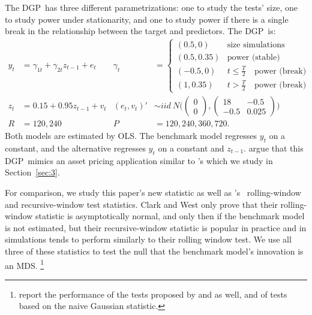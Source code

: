 \documentclass[12pt,fleqn]{article}
\newcommand\citepos[2][]{\citeauthor{#2}'s \citeyearpar[#1]{#2}}
\newcommand\poscw{\citeauthor{ClW:06}'s \citeyearpar{ClW:06,ClW:07}}
\providecommand\testsize{[missing]}
\providecommand\totalsims{[missing]}
\theoremstyle{definition}
\newcommand{\dgp}{DGP}
\newcommand{\mds}{MDS}
\newcommand{\ols}{OLS}
\newcommand{\oos}{OOS}
\begin{document}
The \dgp\ has three different parametrizations: one to study the
tests' size, one to study power under stationarity, and one to study
power if there is a single break in the relationship between the
target and predictors.  The \dgp\ is:
\begin{align*}
  y_t &= \gamma_{1t} + \gamma_{2t} z_{t-1} + e_t &
  \gamma_t &=
  \begin{cases}
    (0.5, 0)    & \text{size simulations} \\
    (0.5, 0.35) & \text{power (stable)} \\
    (-0.5, 0)    & t \leq \tfrac{T}{2} \quad \text{power (break)} \\
    (1, 0.35) & t > \tfrac{T}{2} \quad \text{power (break)}
  \end{cases}\\\nonumber
  z_t &= 0.15 + 0.95 z_{t-1} + v_t &
  (e_t, v_t)' &\sim iid\ N\Bigg(\begin{pmatrix} 0 \\ 0
  \end{pmatrix}
   , \begin{pmatrix} 18 & -
    0.5 \\ -0.5 & 0.025 \end{pmatrix}\Bigg)
  \\ R &= 120, 240 & P &= 120, 240, 360, 720.
\end{align*}
Both models are estimated by \ols. The benchmark model regresses $y_t$
on a constant, and the alternative regresses $y_t$ on a constant and
$z_{t-1}$.  \citet{ClW:07} argue that this \dgp\ mimics an asset
pricing application similar to \citepos{GoW:08} which we study in
Section~\ref{sec:3}.

For comparison, we study this paper's new statistic as well as \poscw\
rolling-window and recursive-window test statistics.  Clark and West
only prove that their rolling-window statistic is asymptotically
normal, and only then if the benchmark model is not estimated, but
their recursive-window statistic is popular in practice and in
simulations tends to perform similarly to their rolling window test.
We use all three of these statistics to test the null that the
benchmark model's innovation is an \mds.%
\footnote{\citet{ClW:07}
  report the performance of the tests proposed by \citet{CCS:01} and
  \citet{ClM:05} as well, and of tests based on the naive Gaussian
  statistic.} %

\begin{table}[tb]
  \centering
  
  \caption{Size and power of the \oos\ tests in the simulations 
    described by Section~\ref{sec:2}, at
    \testsize\% confidence.  These percentages are calculated from \totalsims\
    samples.  Pr[CW roll.] shows the fraction of simulations for
    which Clark and West's (2007) rolling-window statistic rejects; 
    Pr[CW rec.] shows the fraction of simulations for which
    their recursive-window statistic rejects; and Pr[new] shows the fraction of
    simulations for which this paper's test rejects.}
\label{tab:mc1}
\end{table}
\end{document}
